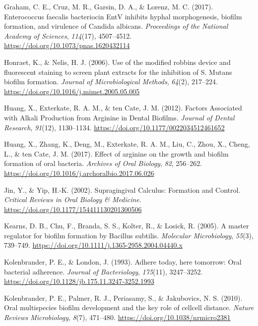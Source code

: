 \documentclass[
  b5paper,
]{book}
\newlength{\cslhangindent}
\newenvironment{CSLReferences}[2] %
 {\begin{list}{}{%
  \setlength{\itemindent}{0pt}
  \setlength{\leftmargin}{0pt}
  \setlength{\parsep}{0pt}
  \ifodd #1
   \setlength{\leftmargin}{\cslhangindent}
   \setlength{\itemindent}{-1\cslhangindent}
  \fi
  \setlength{\itemsep}{#2\baselineskip}}}
 {\end{list}}
\begin{document}
\begin{CSLReferences}{1}{0}
Graham, C. E., Cruz, M. R., Garsin, D. A., \& Lorenz, M. C. (2017).
Enterococcus faecalis bacteriocin {EntV} inhibits hyphal morphogenesis,
biofilm formation, and virulence of {Candida} albicans.
\emph{Proceedings of the National Academy of Sciences}, \emph{114}(17),
4507--4512. \url{https://doi.org/10.1073/pnas.1620432114}

Honraet, K., \& Nelis, H. J. (2006). Use of the modified robbins device
and fluorescent staining to screen plant extracts for the inhibition of
{S}. Mutans biofilm formation. \emph{Journal of Microbiological
Methods}, \emph{64}(2), 217--224.
\url{https://doi.org/10.1016/j.mimet.2005.05.005}

Huang, X., Exterkate, R. A. M., \& ten Cate, J. M. (2012). Factors
{Associated} with {Alkali Production} from {Arginine} in {Dental
Biofilms}. \emph{Journal of Dental Research}, \emph{91}(12), 1130--1134.
\url{https://doi.org/10.1177/0022034512461652}

Huang, X., Zhang, K., Deng, M., Exterkate, R. A. M., Liu, C., Zhou, X.,
Cheng, L., \& ten Cate, J. M. (2017). Effect of arginine on the growth
and biofilm formation of oral bacteria. \emph{Archives of Oral Biology},
\emph{82}, 256--262.
\url{https://doi.org/10.1016/j.archoralbio.2017.06.026}

Jin, Y., \& Yip, H.-K. (2002). Supragingival {Calculus}: {Formation} and
{Control}. \emph{Critical Reviews in Oral Biology \& Medicine}.
\url{https://doi.org/10.1177/154411130201300506}

Kearns, D. B., Chu, F., Branda, S. S., Kolter, R., \& Losick, R. (2005).
A master regulator for biofilm formation by {Bacillus} subtilis.
\emph{Molecular Microbiology}, \emph{55}(3), 739--749.
\url{https://doi.org/10.1111/j.1365-2958.2004.04440.x}

Kolenbrander, P. E., \& London, J. (1993). Adhere today, here tomorrow:
Oral bacterial adherence. \emph{Journal of Bacteriology},
\emph{175}(11), 3247--3252.
\url{https://doi.org/10.1128/jb.175.11.3247-3252.1993}

Kolenbrander, P. E., Palmer, R. J., Periasamy, S., \& Jakubovics, N. S.
(2010). Oral multispecies biofilm development and the key role of
cell\textendash cell distance. \emph{Nature Reviews Microbiology},
\emph{8}(7), 471--480. \url{https://doi.org/10.1038/nrmicro2381}


\end{CSLReferences}
\end{document}

